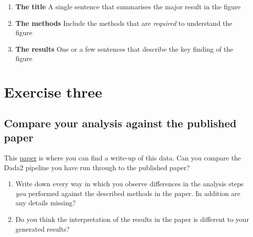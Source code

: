\documentclass[
]{book}
\begin{document}
\begin{enumerate}
\def\labelenumi{\arabic{enumi}.}
\item
  \textbf{The title} A single sentence that summarises the major result in the figure
\item
  \textbf{The methods} Include the methods that are \emph{required} to understand the figure
\item
  \textbf{The results} One or a few sentences that describe the key finding of the figure
\end{enumerate}

\hypertarget{exercise-three}{%
\section{Exercise three}\label{exercise-three}}

\hypertarget{compare-your-analysis-against-the-published-paper}{%
\subsection{Compare your analysis against the published paper}\label{compare-your-analysis-against-the-published-paper}}

This \href{https://www.frontiersin.org/articles/10.3389/fmicb.2015.01470/full}{paper} is where you can find a write-up of this data. Can you compare the Dada2 pipeline you have run through to the published paper?

\begin{enumerate}
\def\labelenumi{\arabic{enumi}.}
\item
  Write down every way in which you observe differences in the analysis steps \emph{you} performed against the described methods in the paper. In addition are any details missing?
\item
  Do you think the interpretation of the results in the paper is different to your generated results?
\end{enumerate}

  
\end{document}
